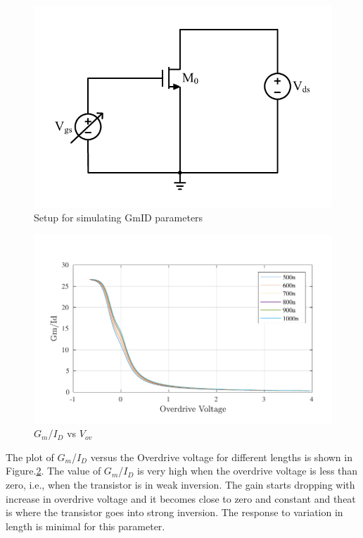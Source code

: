 \begin{figure} [H]
\centering
\includegraphics[scale=1]{Figures/Misc/PDFs/GmID_NMOS.pdf}
\caption{Setup for simulating GmID parameters}
\label{fig:GmID_Ckt}
\end{figure}

\begin{figure} [H]
\centering
\includegraphics[scale=1]{Figures/Misc/PDFs/nmos_len_vovgmid.pdf}
\caption{$G_m$/$I_D$ vs $V_{ov}$}
\label{fig:vovgmid}
\end{figure}

The plot of $G_m$/$I_D$ versus the Overdrive voltage for different lengths is shown in Figure.\ref{fig:vovgmid}. The value of $G_m$/$I_D$ is very high when the overdrive voltage is less than zero, i.e., when the transistor is in weak inversion. The gain starts dropping with increase in overdrive voltage and it becomes close to zero and constant and theat is where the transistor goes into strong inversion. The response to variation in length is minimal for this parameter.

